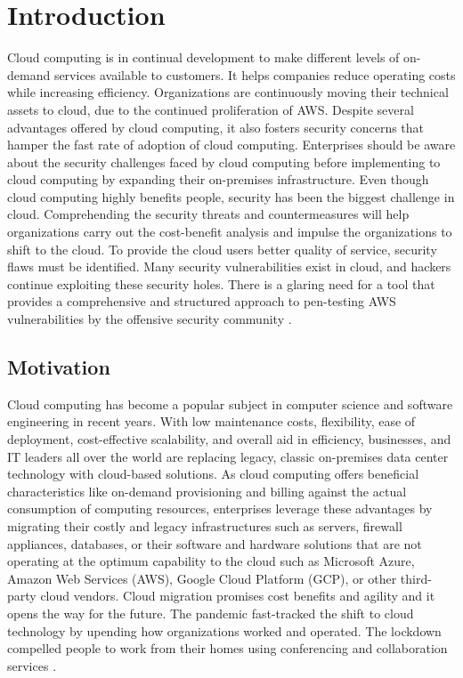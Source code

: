 
\chapter{Introduction}

\par Cloud computing is in continual development to make different levels of on-demand services available to customers.
It helps companies reduce operating costs while increasing efficiency.
Organizations are continuously moving their technical assets to cloud, due to the continued proliferation of AWS. Despite several advantages offered by cloud computing, it also fosters security concerns that hamper the fast rate of adoption of cloud computing.
Enterprises should
be aware about the security challenges
faced
by
cloud computing before implementing to cloud
computing by expanding their
on-premises
infrastructure.
Even though cloud computing highly benefits people,
security has been the biggest challenge in cloud.
Comprehending the security threats and countermeasures will help organizations carry out the cost-benefit analysis and impulse the organizations to shift to the cloud.
To provide the cloud users better quality of service, security flaws must
be identified.
Many security vulnerabilities exist in cloud, and hackers
continue exploiting these security holes.
There is a glaring need for a tool that provides a comprehensive and structured approach to pen-testing AWS vulnerabilities by the offensive security community \cite{2}.

\section{Motivation}
\par Cloud computing has become a
popular subject in computer science and software
engineering in recent years.
With low maintenance costs, flexibility, ease of
deployment, cost-effective scalability, and overall aid in efficiency, businesses, and IT leaders all over the world are replacing legacy, classic on-premises data center technology with cloud-based solutions.
As cloud computing offers beneficial characteristics like
on-demand provisioning and billing against the actual
consumption of computing resources, enterprises leverage
these advantages by migrating their costly and legacy
infrastructures such as servers, firewall appliances,
databases, or their software and hardware solutions that
are not operating at the optimum capability to the cloud
such as Microsoft Azure, Amazon Web Services (AWS), Google
Cloud Platform (GCP), or other third-party cloud vendors.
Cloud migration promises cost benefits and agility and it opens the way for the future.
The pandemic fast-tracked the shift to cloud technology by upending how organizations worked and operated.
The lockdown compelled people to work from their homes using conferencing and collaboration services \cite{2}.


